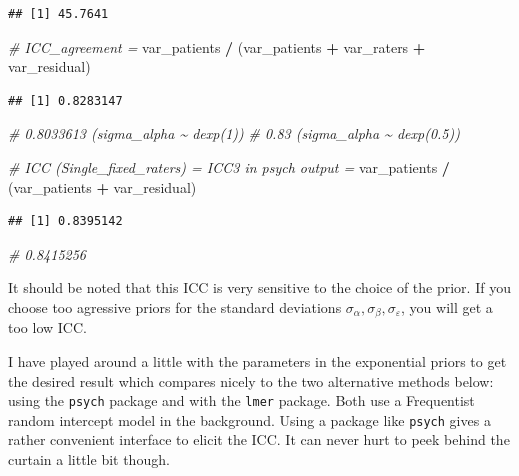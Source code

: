 \documentclass[
]{book}
\newenvironment{Shaded}{\begin{snugshade}}{\end{snugshade}}
\newcommand{\CommentTok}[1]{\textcolor[rgb]{0.56,0.35,0.01}{\textit{#1}}}
\newcommand{\NormalTok}[1]{#1}
\newcommand{\SpecialCharTok}[1]{\textcolor[rgb]{0.81,0.36,0.00}{\textbf{#1}}}
\begin{document}
\begin{verbatim}
## [1] 45.7641
\end{verbatim}

\begin{Shaded}
\begin{Highlighting}[]
\CommentTok{\# ICC\_agreement = }
\NormalTok{var\_patients }\SpecialCharTok{/}\NormalTok{ (var\_patients }\SpecialCharTok{+}\NormalTok{ var\_raters }\SpecialCharTok{+}\NormalTok{ var\_residual)}
\end{Highlighting}
\end{Shaded}

\begin{verbatim}
## [1] 0.8283147
\end{verbatim}

\begin{Shaded}
\begin{Highlighting}[]
\CommentTok{\# 0.8033613 (sigma\_alpha \textasciitilde{} dexp(1))}
\CommentTok{\# 0.83 (sigma\_alpha \textasciitilde{} dexp(0.5))}

\CommentTok{\# ICC (Single\_fixed\_raters) = ICC3 in psych output = }
\NormalTok{var\_patients }\SpecialCharTok{/}\NormalTok{ (var\_patients }\SpecialCharTok{+}\NormalTok{ var\_residual)}
\end{Highlighting}
\end{Shaded}

\begin{verbatim}
## [1] 0.8395142
\end{verbatim}

\begin{Shaded}
\begin{Highlighting}[]
\CommentTok{\# 0.8415256}
\end{Highlighting}
\end{Shaded}

It should be noted that this ICC is very sensitive to the choice of the prior.
If you choose too agressive priors for the standard deviations \(\sigma_{\alpha},
\sigma_{\beta}, \sigma_{\varepsilon}\), you will get a too low ICC.

I have played around a little with the parameters in the exponential priors
to get the desired result which compares nicely to the two alternative methods below:
using the \texttt{psych} package and with the \texttt{lmer}
package. Both use a Frequentist random intercept model in the background.
Using a package like \texttt{psych} gives a rather convenient interface to
elicit the ICC. It can never hurt to peek behind the curtain a little bit though.
\end{document}
